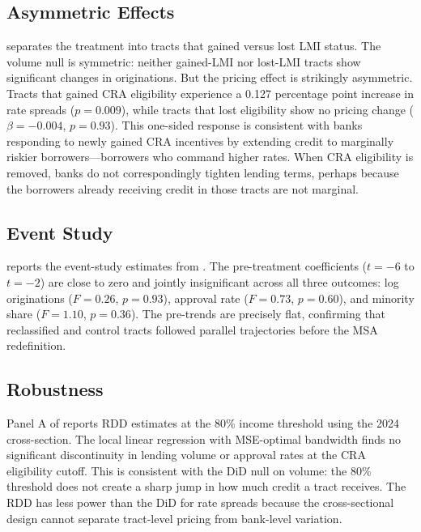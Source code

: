 \documentclass[12pt]{article}
\begin{document}
\subsection{Asymmetric Effects}



 separates the treatment into tracts that gained versus lost LMI status. The volume null is symmetric: neither gained-LMI nor lost-LMI tracts show significant changes in originations. But the pricing effect is strikingly asymmetric. Tracts that gained CRA eligibility experience a 0.127 percentage point increase in rate spreads ($p = 0.009$), while tracts that lost eligibility show no pricing change ($\beta = -0.004$, $p = 0.93$). This one-sided response is consistent with banks responding to newly gained CRA incentives by extending credit to marginally riskier borrowers---borrowers who command higher rates. When CRA eligibility is removed, banks do not correspondingly tighten lending terms, perhaps because the borrowers already receiving credit in those tracts are not marginal.

\subsection{Event Study}



 reports the event-study estimates from . The pre-treatment coefficients ($t = -6$ to $t = -2$) are close to zero and jointly insignificant across all three outcomes: log originations ($F = 0.26$, $p = 0.93$), approval rate ($F = 0.73$, $p = 0.60$), and minority share ($F = 1.10$, $p = 0.36$). The pre-trends are precisely flat, confirming that reclassified and control tracts followed parallel trajectories before the MSA redefinition.

\subsection{Robustness}



Panel A of  reports RDD estimates at the 80\% income threshold using the 2024 cross-section. The local linear regression with MSE-optimal bandwidth finds no significant discontinuity in lending volume or approval rates at the CRA eligibility cutoff. This is consistent with the DiD null on volume: the 80\% threshold does not create a sharp jump in how much credit a tract receives. The RDD has less power than the DiD for rate spreads because the cross-sectional design cannot separate tract-level pricing from bank-level variation.
\end{document}
